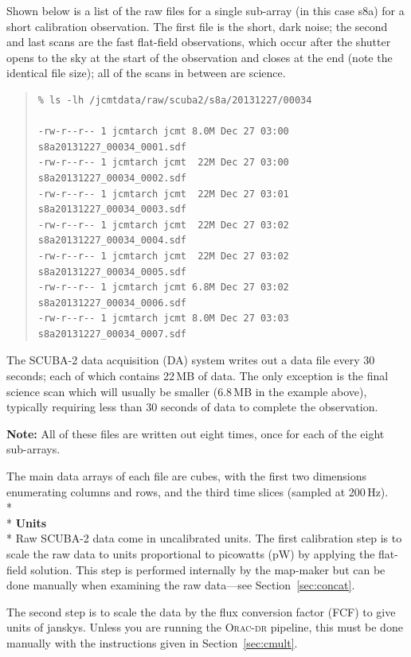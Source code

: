 \documentclass[twoside,11pt]{article}
\newcommand{\htmlref}[2]{#1}
\newcommand{\latexhtml}[2]{#1}
\renewcommand{\_}{\texttt{\symbol{95}}}
\newenvironment{myquote}{
   \color{MidnightBlue}\begin{quote}\begin{small}}{
   \end{small}\end{quote}
}
\newcommand{\cref}[3]{\latexhtml{#1~\ref{#2}}{\htmlref{#3}{#2}}}
\renewenvironment{myquote}{
      \begin{quote}\begin{small}}{
      \end{small}\end{quote}
   }
\begin{document}
Shown below is a list of the raw files for a single sub-array (in this
case s8a) for a short calibration observation. The first file is the
short, dark noise; the second and last scans are the fast flat-field
observations, which occur after the shutter opens to the sky at the
start of the observation and closes at the end (note the identical
file size); all of the scans in between are science.


\begin{myquote}
\begin{verbatim}
% ls -lh /jcmtdata/raw/scuba2/s8a/20131227/00034

-rw-r--r-- 1 jcmtarch jcmt 8.0M Dec 27 03:00 s8a20131227_00034_0001.sdf
-rw-r--r-- 1 jcmtarch jcmt  22M Dec 27 03:00 s8a20131227_00034_0002.sdf
-rw-r--r-- 1 jcmtarch jcmt  22M Dec 27 03:01 s8a20131227_00034_0003.sdf
-rw-r--r-- 1 jcmtarch jcmt  22M Dec 27 03:02 s8a20131227_00034_0004.sdf
-rw-r--r-- 1 jcmtarch jcmt  22M Dec 27 03:02 s8a20131227_00034_0005.sdf
-rw-r--r-- 1 jcmtarch jcmt 6.8M Dec 27 03:02 s8a20131227_00034_0006.sdf
-rw-r--r-- 1 jcmtarch jcmt 8.0M Dec 27 03:03 s8a20131227_00034_0007.sdf
\end{verbatim}
\end{myquote}
The SCUBA-2 data
acquisition (DA) system writes out a data file every 30 seconds; each
of which contains 22\,MB of data. The only exception is the final science
scan which will usually be smaller (6.8\,MB in the example above), typically
requiring less than 30 seconds of data to complete the observation.

\textbf{Note:} All of these files are written out eight times, once for each of
the eight sub-arrays.

The main data arrays of each file are cubes, with the first two
dimensions enumerating columns and rows, and the third time slices
(sampled at 200\,Hz).
\\*\\*
\textbf{Units}\\*
Raw SCUBA-2 data come in uncalibrated units. The first calibration
step is to scale the raw data to units proportional to picowatts (pW)
by applying the flat-field solution. This step is performed internally
 by the map-maker but can be done manually when examining the raw data---see
\cref{Section}{sec:concat}{Concatenate \& apply a flat-field}.

The second step is to scale the data by the flux conversion factor
(FCF) to give units of janskys. Unless you are running the
\textsc{Orac-dr} pipeline, this must be done manually with the
instructions given in \cref{Section}{sec:cmult}{Flux conversion
factors}.
\end{document}
